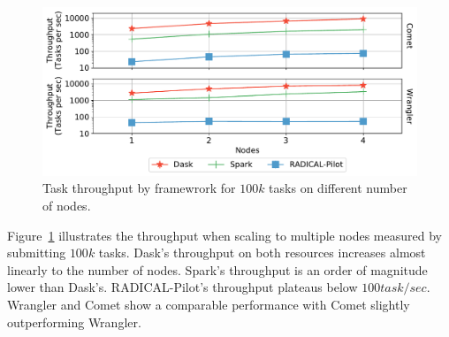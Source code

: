 \begin{figure}[t]
    \centering
    \includegraphics[width=.75\textwidth]{figures/data_analytics_hpc/task_par/daskVSsparkVSRpThroughput.pdf}
    \caption{Task throughput by framewrork for $100k$ tasks on different number of nodes.}
    \label{fig:RP_Dask_Spark_throughput}
\end{figure}

Figure~\ref{fig:RP_Dask_Spark_throughput} illustrates the throughput when scaling to multiple nodes measured by submitting $100k$ tasks.
Dask's throughput on both resources increases almost linearly to the number of nodes.
Spark's throughput is an order of magnitude lower than Dask's.
RADICAL-Pilot's throughput plateaus below $100 task/sec$.
Wrangler and Comet show a comparable performance with Comet slightly outperforming Wrangler.



